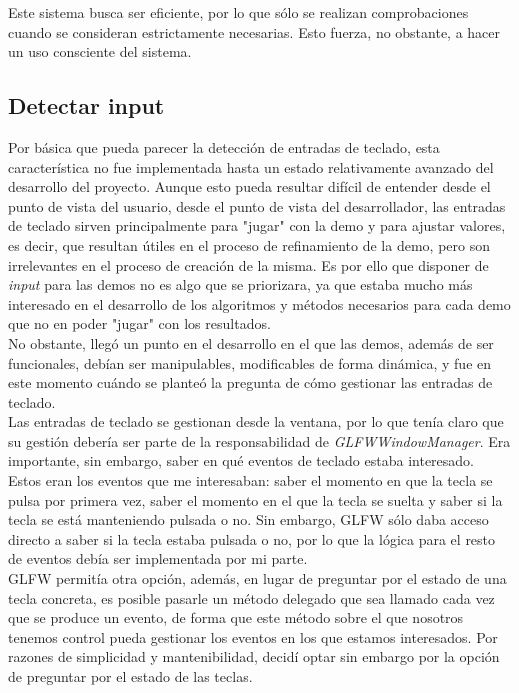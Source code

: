 Este sistema busca ser eficiente, por lo que sólo se realizan comprobaciones cuando se consideran estrictamente necesarias. Esto fuerza, no obstante, a hacer un uso consciente del sistema.

\subsection{Detectar input}

Por básica que pueda parecer la detección de entradas de teclado, esta característica no fue implementada hasta un estado relativamente avanzado del desarrollo del proyecto. Aunque esto pueda resultar difícil de entender desde el punto de vista del usuario, desde el punto de vista del desarrollador, las entradas de teclado sirven principalmente para "jugar" con la demo y para ajustar valores, es decir, que resultan útiles en el proceso de refinamiento de la demo, pero son irrelevantes en el proceso de creación de la misma. Es por ello que disponer de \emph{input} para las demos no es algo que se priorizara, ya que estaba mucho más interesado en el desarrollo de los algoritmos y métodos necesarios para cada demo que no en poder "jugar" con los resultados.\\

No obstante, llegó un punto en el desarrollo en el que las demos, además de ser funcionales, debían ser manipulables, modificables de forma dinámica, y fue en este momento cuándo se planteó la pregunta de cómo gestionar las entradas de teclado.\\

Las entradas de teclado se gestionan desde la ventana, por lo que tenía claro que su gestión debería ser parte de la responsabilidad de \emph{GLFWWindowManager}. Era importante, sin embargo, saber en qué eventos de teclado estaba interesado.\\

Estos eran los eventos que me interesaban: saber el momento en que la tecla se pulsa por primera vez, saber el momento en el que la tecla se suelta y saber si la tecla se está manteniendo pulsada o no. Sin embargo, GLFW sólo daba acceso directo a saber si la tecla estaba pulsada o no, por lo que la lógica para el resto de eventos debía ser implementada por mi parte.\\

GLFW permitía otra opción, además, en lugar de preguntar por el estado de una tecla concreta, es posible pasarle un método delegado que sea llamado cada vez que se produce un evento, de forma que este método sobre el que nosotros tenemos control pueda gestionar los eventos en los que estamos interesados. Por razones de simplicidad y mantenibilidad, decidí optar sin embargo por la opción de preguntar por el estado de las teclas.\\


